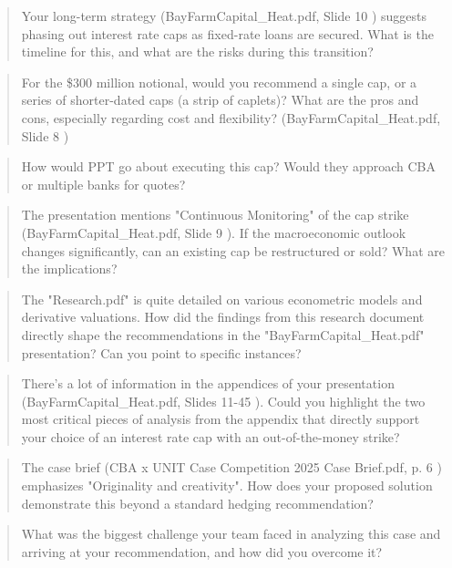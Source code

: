 \documentclass[11pt, a4paper, british]{article}
\begin{document}
\newpage

\begin{quote}
    Your long-term strategy (BayFarmCapital_Heat.pdf, Slide 10 ) suggests phasing out interest rate caps as fixed-rate loans are secured. What is the timeline for this, and what are the risks during this transition?
\end{quote}

\newpage

\begin{quote}
    For the \$300 million notional, would you recommend a single cap, or a series of shorter-dated caps (a strip of caplets)? What are the pros and cons, especially regarding cost and flexibility? (BayFarmCapital_Heat.pdf, Slide 8 )
\end{quote}

\newpage

\begin{quote}
    How would PPT go about executing this cap? Would they approach CBA or multiple banks for quotes?
\end{quote}

\newpage

\begin{quote}
    The presentation mentions "Continuous Monitoring" of the cap strike (BayFarmCapital_Heat.pdf, Slide 9 ). If the macroeconomic outlook changes significantly, can an existing cap be restructured or sold? What are the implications?
\end{quote}

\newpage

\begin{quote}
    The "Research.pdf" is quite detailed on various econometric models and derivative valuations. How did the findings from this research document directly shape the recommendations in the "BayFarmCapital_Heat.pdf" presentation? Can you point to specific instances?
\end{quote}

\newpage

\begin{quote}
    There's a lot of information in the appendices of your presentation (BayFarmCapital_Heat.pdf, Slides 11-45 ). Could you highlight the two most critical pieces of analysis from the appendix that directly support your choice of an interest rate cap with an out-of-the-money strike?
\end{quote}

\newpage

\begin{quote}
    The case brief (CBA x UNIT Case Competition 2025 Case Brief.pdf, p. 6 ) emphasizes "Originality and creativity". How does your proposed solution demonstrate this beyond a standard hedging recommendation?
\end{quote}

\newpage

\begin{quote}
    What was the biggest challenge your team faced in analyzing this case and arriving at your recommendation, and how did you overcome it?
\end{quote}

\newpage

\printbibliography
\end{document}
